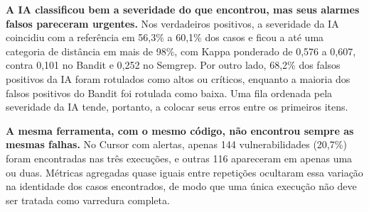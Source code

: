 \textbf{A IA classificou bem a severidade do que encontrou, mas seus alarmes
falsos pareceram urgentes.} Nos verdadeiros positivos, a severidade da IA
coincidiu com a referência em 56,3\% a 60,1\% dos casos e ficou a até uma
categoria de distância em mais de 98\%, com Kappa ponderado de 0,576 a 0,607,
contra 0,101 no Bandit e 0,252 no Semgrep. Por outro lado, 68,2\% dos falsos
positivos da IA foram rotulados como altos ou críticos, enquanto a maioria dos
falsos positivos do Bandit foi rotulada como baixa. Uma fila ordenada pela
severidade da IA tende, portanto, a colocar seus erros entre os primeiros itens.

\textbf{A mesma ferramenta, com o mesmo código, não encontrou sempre as mesmas
falhas.} No Cursor com alertas, apenas 144 vulnerabilidades (20,7\%) foram
encontradas nas três execuções, e outras 116 apareceram em apenas uma ou duas.
Métricas agregadas quase iguais entre repetições ocultaram essa variação na
identidade dos casos encontrados, de modo que uma única execução não deve ser
tratada como varredura completa.
